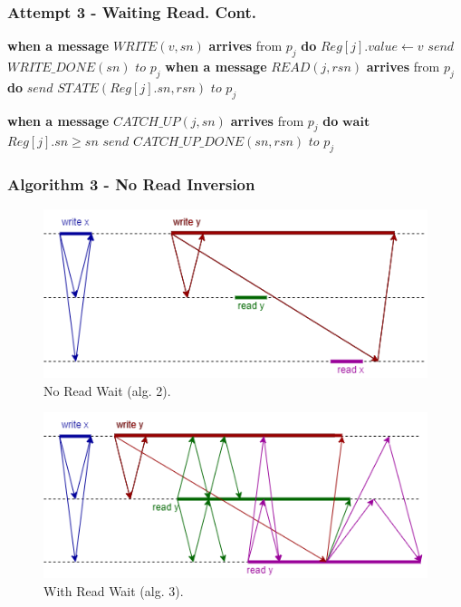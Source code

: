 \begin{frame}[fragile]
    \frametitle{Attempt 3 - Waiting Read. Cont.}
    \begin{algorithm}[H]
        \begin{algorithmic}[0]
        \STATE \textbf{when a message} $WRITE(v, sn)$ \textbf{arrives} from $p_j$ \textbf{do}
        \bindent
            \STATE $Reg[j].value \leftarrow v$
            \STATE $send$ $WRITE\_DONE(sn)$ $to$ $p_j$
        \eindent
        \STATE \textbf{when a message} $READ(j, rsn)$ \textbf{arrives} from $p_j$ \textbf{do}
        \bindent
            \STATE $send$ $STATE(Reg[j].sn, rsn)$ $to$ $p_j$
        \eindent
        
        \STATE \textbf{when a message} $CATCH\_UP(j, sn)$ \textbf{arrives} from $p_j$ \textbf{do}
        \bindent
            \STATE $\textbf{wait}$ $Reg[j].sn \geq sn$
            \STATE $send$ $CATCH\_UP\_DONE(sn, rsn)$ $to$ $p_j$
        \eindent
    \end{algorithmic}
        \caption*{}
    \end{algorithm}
\end{frame}

\begin{frame}
    \frametitle{Algorithm 3 - No Read Inversion}
    \begin{center}
        \begin{figure}
            \includegraphics[scale=.35]{alg2_incorrectness.png}
            \caption*{No Read Wait (alg. 2).}
        \end{figure}
        \begin{figure}
            \includegraphics[scale=.35]{alg3_no_read_inversion.png}
            \caption*{With Read Wait (alg. 3).}
        \end{figure}
    \end{center}
\end{frame}

